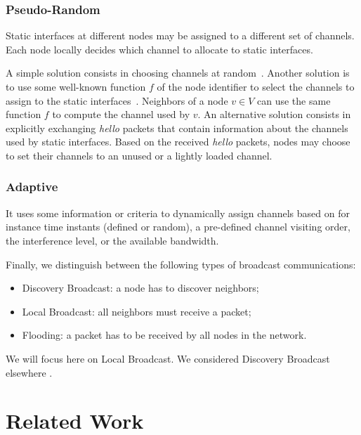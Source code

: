 \documentclass[twoside]{article}
\begin{document}
\subsubsection{Pseudo-Random} 

Static interfaces at different nodes may be assigned to a different set of channels. Each node locally decides which channel to allocate to static interfaces. 

  A simple solution consists in choosing channels at
  random~\cite{mao07}. Another solution is to use some well-known
  function $f$ of the node identifier to select the channels to assign to the
  static interfaces~\cite{kyasanur05}. Neighbors of a node $v\in V$ can use the
  same function $f$ to compute the channel used by $v$. An alternative solution
  consists in explicitly exchanging \textit{hello} packets that contain
  information about the channels used by static interfaces. Based on the
  received \textit{hello} packets, nodes may choose to set their channels to an
  unused or a lightly loaded channel.

\subsubsection{Adaptive}

It uses some information or criteria to dynamically
  assign channels based on for instance time instants (defined or random), a
  pre-defined channel visiting order, the interference level, or the available
  bandwidth.






Finally, we distinguish between the following types of broadcast communications:
\begin{itemize}
 	\item Discovery Broadcast: a node has to discover neighbors;
 	\item Local Broadcast: all neighbors must receive a packet;
 	\item Flooding: a packet has to be received by all nodes in the network.
\end{itemize}

We will focus here on  Local Broadcast. 
We considered  Discovery Broadcast elsewhere \cite{abdelali10}.   





\section{Related Work}
\label{section:related_work}
\end{document}
